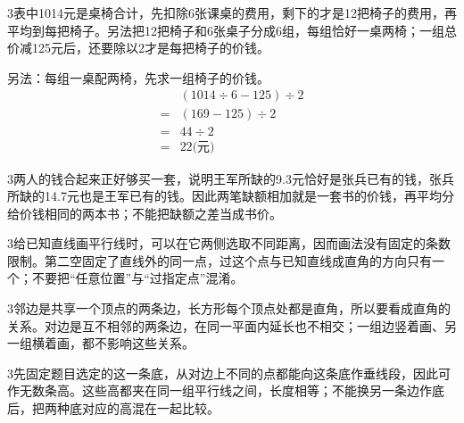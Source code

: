 \documentclass[multi=snippet,border={5bp 20bp 5bp 5bp}]{standalone}
\newenvironment{snippet}[3]{\begin{minipage}{#1bp}\color{answerred}\fontsize{#2}{#3}\selectfont\raggedright}{\end{minipage}}
\begin{document}
\begin{snippet}{505}{11.5}{14}\begin{multicols}{3}\raggedcolumns 表中1014元是桌椅合计，先扣除6张课桌的费用，剩下的才是12把椅子的费用，再平均到每把椅子。另法把12把椅子和6张桌子分成6组，每组恰好一桌两椅；一组总价减125元后，还要除以2才是每把椅子的价钱。\par 另法：每组一桌配两椅，先求一组椅子的价钱。\[\begin{aligned}&(1014\div6-125)\div2\\={}&(169-125)\div2\\={}&44\div2\\={}&22\text{(元)}\end{aligned}\]\end{multicols}\end{snippet}
\begin{snippet}{505}{11.5}{14}\begin{multicols}{3}\raggedcolumns 两人的钱合起来正好够买一套，说明王军所缺的9.3元恰好是张兵已有的钱，张兵所缺的14.7元也是王军已有的钱。因此两笔缺额相加就是一套书的价钱，再平均分给价钱相同的两本书；不能把缺额之差当成书价。\end{multicols}\end{snippet}
\begin{snippet}{505}{11.5}{14}\begin{multicols}{3}\raggedcolumns 给已知直线画平行线时，可以在它两侧选取不同距离，因而画法没有固定的条数限制。第二空固定了直线外的同一点，过这个点与已知直线成直角的方向只有一个；不要把“任意位置”与“过指定点”混淆。\end{multicols}\end{snippet}
\begin{snippet}{505}{11.5}{14}\begin{multicols}{3}\raggedcolumns 邻边是共享一个顶点的两条边，长方形每个顶点处都是直角，所以要看成直角的关系。对边是互不相邻的两条边，在同一平面内延长也不相交；一组边竖着画、另一组横着画，都不影响这些关系。\end{multicols}\end{snippet}
\begin{snippet}{505}{11.5}{14}\begin{multicols}{3}\raggedcolumns 先固定题目选定的这一条底，从对边上不同的点都能向这条底作垂线段，因此可作无数条高。这些高都夹在同一组平行线之间，长度相等；不能换另一条边作底后，把两种底对应的高混在一起比较。\end{multicols}\end{snippet}
\end{document}
